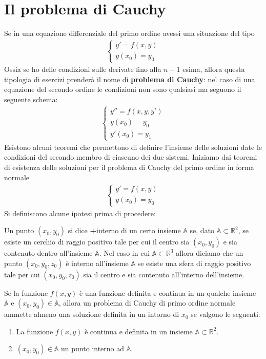 \documentclass[a4paper, oneside]{book}
\begin{document}
\section{Il problema di Cauchy}
Se in una equazione differenziale del primo ordine avessi una situazione del tipo
\begin{gather*}
    \left\{\begin{array}{l}
        y' = f(x, y) \\
        y(x_0) = y_0
    \end{array}\right.
\end{gather*}
Ossia se ho delle condizioni sulle derivate fino alla $n-1$ esima, allora
questa tipologia di esercizi prenderà il nome di \textbf{problema di Cauchy}:
nel caso di una equazione del secondo ordine le condizioni non sono qualsiasi ma 
seguono il seguente schema:
\begin{gather*}
    \left\{\begin{array}{l}
        y'' = f(x, y, y') \\
        y(x_0) = y_0 \\
        y'(x_0) = y_1
    \end{array}\right.
\end{gather*}
Esistono alcuni teoremi che permettono di definire l'insieme delle soluzioni date
le condizioni del secondo membro di ciascuno dei due sistemi. Iniziamo dai
teoremi di esistenza delle soluzioni per il problema di Cauchy del primo ordine
in forma normale 
\begin{gather*}
    \left\{\begin{array}{l}
        y' = f(x, y) \\
        y(x_0) = y_0
    \end{array}\right.
\end{gather*}
Si definiscono alcune ipotesi prima di procedere:
\begin{definition}
    Un punto $(x_0, y_0)$ si dice \textbf+{interno} di un certo insieme $\mathbb{A}$ se,
    dato $\mathbb{A} \subset \mathbb{R}^{2}$, se esiste un cerchio di raggio positivo tale per cui il centro sia $(x_0, y_0)$ e sia contenuto
    dentro all'insieme $\mathbb{A}$. Nel caso in cui $\mathbb{A} \subset \mathbb{R}^{3}$ allora diciamo che un punto
    $(x_0, y_0, z_0)$ è interno all'insieme $\mathbb{A}$ se esiste una sfera di raggio positivo tale per cui
    $(x_0, y_0, z_0)$ sia il centro e sia contenuto all'interno dell'insieme.
\end{definition}
\begin{theorem}
    Se la funzione $f(x, y)$ è una funzione definita e continua  in un qualche insieme
    $\mathbb{A}$ e $(x_0, y_0) \in \mathbb{A}$, allora un problema di Cauchy di primo ordine 
    normale ammette almeno una soluzione definita in un intorno di $x_0$ se valgono le seguenti:
    \begin{enumerate}
    \item La funzione $f(x, y)$ è continua e definita in un insieme $\mathbb{A} \subset \mathbb{R}^{2}$.
    \item $(x_0, y_0) \in \mathbb{A}$ un punto interno ad $\mathbb{A}$.
\end{enumerate}
\end{theorem}
\end{document}
